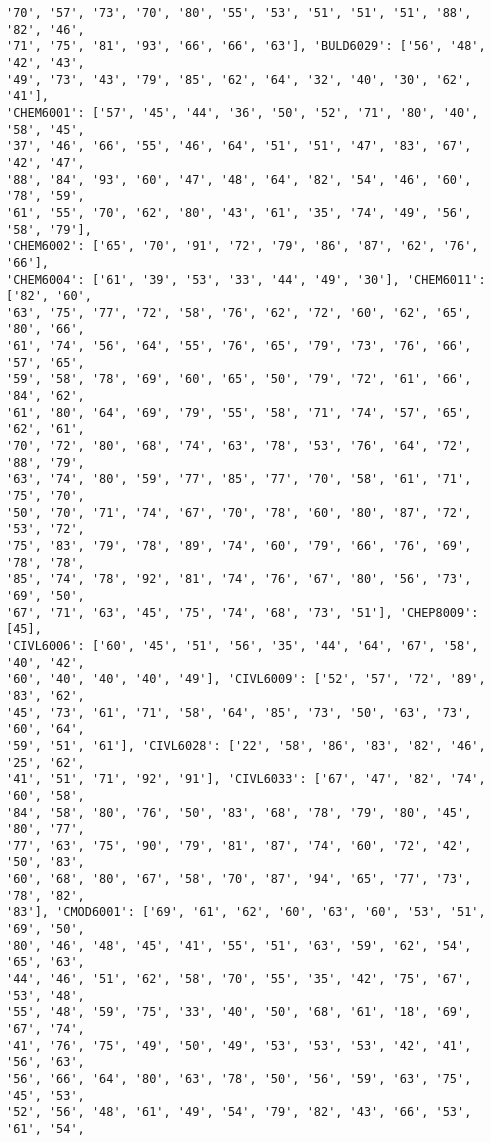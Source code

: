 \documentclass[11pt]{article}
\begin{document}
\begin{Verbatim}[commandchars=\\\{\}]
'70', '57', '73', '70', '80', '55', '53', '51', '51', '51', '88', '82', '46',
'71', '75', '81', '93', '66', '66', '63'], 'BULD6029': ['56', '48', '42', '43',
'49', '73', '43', '79', '85', '62', '64', '32', '40', '30', '62', '41'],
'CHEM6001': ['57', '45', '44', '36', '50', '52', '71', '80', '40', '58', '45',
'37', '46', '66', '55', '46', '64', '51', '51', '47', '83', '67', '42', '47',
'88', '84', '93', '60', '47', '48', '64', '82', '54', '46', '60', '78', '59',
'61', '55', '70', '62', '80', '43', '61', '35', '74', '49', '56', '58', '79'],
'CHEM6002': ['65', '70', '91', '72', '79', '86', '87', '62', '76', '66'],
'CHEM6004': ['61', '39', '53', '33', '44', '49', '30'], 'CHEM6011': ['82', '60',
'63', '75', '77', '72', '58', '76', '62', '72', '60', '62', '65', '80', '66',
'61', '74', '56', '64', '55', '76', '65', '79', '73', '76', '66', '57', '65',
'59', '58', '78', '69', '60', '65', '50', '79', '72', '61', '66', '84', '62',
'61', '80', '64', '69', '79', '55', '58', '71', '74', '57', '65', '62', '61',
'70', '72', '80', '68', '74', '63', '78', '53', '76', '64', '72', '88', '79',
'63', '74', '80', '59', '77', '85', '77', '70', '58', '61', '71', '75', '70',
'50', '70', '71', '74', '67', '70', '78', '60', '80', '87', '72', '53', '72',
'75', '83', '79', '78', '89', '74', '60', '79', '66', '76', '69', '78', '78',
'85', '74', '78', '92', '81', '74', '76', '67', '80', '56', '73', '69', '50',
'67', '71', '63', '45', '75', '74', '68', '73', '51'], 'CHEP8009': [45],
'CIVL6006': ['60', '45', '51', '56', '35', '44', '64', '67', '58', '40', '42',
'60', '40', '40', '40', '49'], 'CIVL6009': ['52', '57', '72', '89', '83', '62',
'45', '73', '61', '71', '58', '64', '85', '73', '50', '63', '73', '60', '64',
'59', '51', '61'], 'CIVL6028': ['22', '58', '86', '83', '82', '46', '25', '62',
'41', '51', '71', '92', '91'], 'CIVL6033': ['67', '47', '82', '74', '60', '58',
'84', '58', '80', '76', '50', '83', '68', '78', '79', '80', '45', '80', '77',
'77', '63', '75', '90', '79', '81', '87', '74', '60', '72', '42', '50', '83',
'60', '68', '80', '67', '58', '70', '87', '94', '65', '77', '73', '78', '82',
'83'], 'CMOD6001': ['69', '61', '62', '60', '63', '60', '53', '51', '69', '50',
'80', '46', '48', '45', '41', '55', '51', '63', '59', '62', '54', '65', '63',
'44', '46', '51', '62', '58', '70', '55', '35', '42', '75', '67', '53', '48',
'55', '48', '59', '75', '33', '40', '50', '68', '61', '18', '69', '67', '74',
'41', '76', '75', '49', '50', '49', '53', '53', '53', '42', '41', '56', '63',
'56', '66', '64', '80', '63', '78', '50', '56', '59', '63', '75', '45', '53',
'52', '56', '48', '61', '49', '54', '79', '82', '43', '66', '53', '61', '54',

\end{Verbatim}
\end{document}
